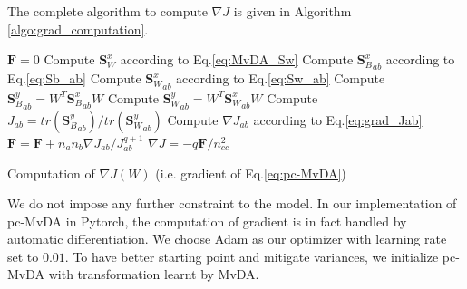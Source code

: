     The complete algorithm to compute $\nabla J$ is given in Algorithm \ref{algo:grad_computation}.

    \begin{algorithm}
        \SetEndCharOfAlgoLine{\relax}
        $\boldsymbol{F} = 0$\;
        Compute $\boldsymbol{S}_W^x$ according to Eq.\eqref{eq:MvDA_Sw}\;
         {
             {
                Compute ${\boldsymbol{S}_B^x}_{ab}$ according to Eq.\eqref{eq:Sb_ab}\;
                Compute ${\boldsymbol{S}_W^x}_{ab}$ according to Eq.\eqref{eq:Sw_ab}\;
                Compute ${\boldsymbol{S}_B^y}_{ab}=W^T{\boldsymbol{S}_B^x}_{ab}W$\;
                Compute ${\boldsymbol{S}_W^y}_{ab}=W^T{\boldsymbol{S}_W^x}_{ab}W$\;
                Compute $J_{ab}=tr\left({\boldsymbol{S}_B^y}_{ab}\right)/tr\left({\boldsymbol{S}_W^y}_{ab}\right)$\;
                Compute $\nabla J_{ab}$ according to Eq.\eqref{eq:grad_Jab}\;
                $\boldsymbol{F} = \boldsymbol{F} + n_an_b\nabla J_{ab}/J_{ab}^{q+1}$\;
            }
        }
        $\nabla J = {-q\boldsymbol{F}}/{n_{cc}^2}$\;
        \caption{Computation of $\nabla J\left(W\right)$ (i.e. gradient of Eq.\eqref{eq:pc-MvDA})}
        \label{algo:grad_computation}
    \end{algorithm}

    We do not impose any further constraint to the model. In our implementation of pc-MvDA in Pytorch, the computation of gradient is in fact handled by automatic differentiation. We choose Adam as our optimizer with learning rate set to $0.01$. To have better starting point and mitigate variances, we initialize pc-MvDA with transformation learnt by MvDA.